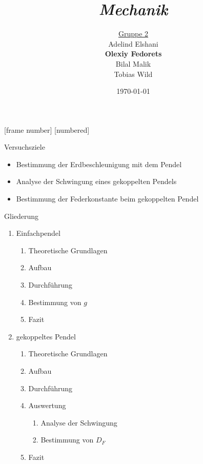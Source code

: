 \documentclass[12pt]{beamer}
\begin{document}

[frame number]
[numbered]

\title{\emph{Mechanik}}
\author{\underline{Gruppe 2}  \\ \vskip 0.5cm Adelind Elshani \\ \textbf{Olexiy Fedorets} \\ Bilal Malik \\ Tobias Wild}
\date{\today}	


\begin{frame}[plain]
\titlepage
\end{frame}


\begin{frame}{Versuchsziele}
\Large
\begin{itemize}
\centering
\item Bestimmung der Erdbeschleunigung mit dem Pendel
\item Analyse der Schwingung eines gekoppelten Pendels
\item Bestimmung der Federkonstante beim gekoppelten Pendel
\end{itemize}
\end{frame}


\begin{frame}{Gliederung}
\Large
\begin{enumerate}
\item{Einfachpendel}
	\begin{enumerate}
	\item{Theoretische Grundlagen}
	\item{Aufbau}
	\item{Durchführung}
	\item{Bestimmung von $g$}
	\item{Fazit}
	\end{enumerate}
\item{gekoppeltes Pendel}
	\begin{enumerate}
	\item{Theoretische Grundlagen}
	\item{Aufbau}
	\item{Durchführung}
	\item{Auswertung}
		\begin{enumerate}
		\item{Analyse der Schwingung}
		\item{Bestimmung von $D_F$}
		\end{enumerate}
	\item{Fazit}
	\end{enumerate}
\end{enumerate}

\end{frame}
\end{document}

